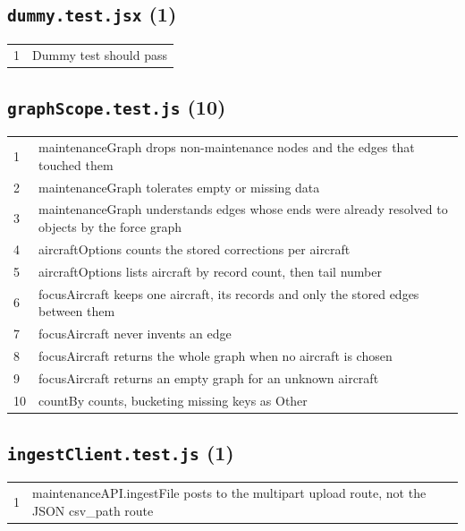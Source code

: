 \subsection*{\texttt{dummy.test.jsx} (1)}
\begin{longtable}{p{}p{}}
1 & Dummy test should pass \\
\end{longtable}
\subsection*{\texttt{graphScope.test.js} (10)}
\begin{longtable}{p{}p{}}
1 & maintenanceGraph drops non-maintenance nodes and the edges that touched them \\
2 & maintenanceGraph tolerates empty or missing data \\
3 & maintenanceGraph understands edges whose ends were already resolved to objects by the force graph \\
4 & aircraftOptions counts the stored corrections per aircraft \\
5 & aircraftOptions lists aircraft by record count, then tail number \\
6 & focusAircraft keeps one aircraft, its records and only the stored edges between them \\
7 & focusAircraft never invents an edge \\
8 & focusAircraft returns the whole graph when no aircraft is chosen \\
9 & focusAircraft returns an empty graph for an unknown aircraft \\
10 & countBy counts, bucketing missing keys as Other \\
\end{longtable}
\subsection*{\texttt{ingestClient.test.js} (1)}
\begin{longtable}{p{}p{}}
1 & maintenanceAPI.ingestFile posts to the multipart upload route, not the JSON csv\_path route \\
\end{longtable}
\normalsize
